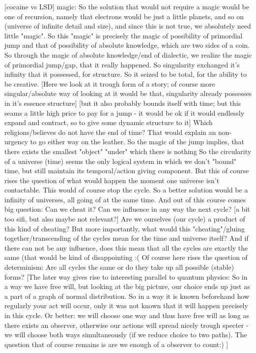 \documentclass[10pt]{book}
\begin{document}
[cocaine vs LSD]
magic:
So the solution that would not require a magic would be one of recursion, namely that electrons would be just a little planets, and so on (universe of infinite detail and size), and since this is not true, we absolutely need little "magic". So this "magic" is precisely the magic of possibility of primordial jump and that of possibility of absolute knowledge, which are two sides of a coin. So through the magic of absolute knowledge/end of dialectic, we realize the magic of primordial jump/gap, that it really happened. So singularity exchanged it's infinity that it possessed, for structure. So it seized to be total, for the ability to be creative. [Here we look at it trough form of a story; of course more singular/absolute way of looking at it would be that, singularity already possesses in it's essence structure] [but it also probably bounds itself with time; but this seams a little high price to pay for a jump - it would be ok if it would endlessly expand and contract, so to give some dynamic structure to it]
Which religions/believes do not have the end of time? That would explain an non-urgency to go either way on the leather.
So the magic of the jump implies, that there exists the smallest "object" "under" which there is nothing
So the circularity of a universe (time) seems the only logical system in which we don't "bound" time, but still maintain its temporal/action giving component.
But this of course rises the question of what would happen the moment one universe isn't contactable. This would of course stop the cycle. So a better solution would be a infinity of universes, all going of at the same time.
And out of this course comes big question: Can we cheat it? Can we influence in any way the next cycle? [a bit too sifi, but also maybe not relevant?] Are we ourselves (our cycle) a product of this kind of cheating? But more importantly, what would this "cheating"/gluing together/transcending of the cycles mean for the time and universe itself?
And if there can not be any influence, does this mean that all the cycles are exactly the same (that would be kind of disappointing :( Of course here rises the question of determinism: Are all cycles the same or do they take up all possible (stable) forms? [The later way gives rise to interesting parallel to quantum physics: So in a way we have free will, but looking at the big picture, our choice ends up just as a part of a graph of normal distribution. So in a way it is known beforehand how regularly your act will occur, only it was not known that it will happen precisely in this cycle. Or better: we will choose one way and thus have free will as long as there exists an observer, otherwise our actions will spread nicely trough specter - we will choose both ways simultaneously (if we reduce choice to two paths). The question that of course remains is are we enough of a observer to count:) ]
\end{document}
